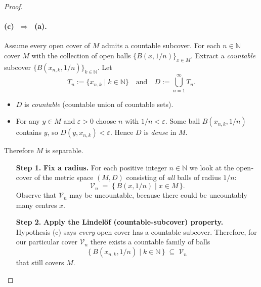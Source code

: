 \documentclass[12pt]{article}
\theoremstyle{definition} %
\theoremstyle{plain} %
\begin{document}
\begin{proof}
  \paragraph{\textbf{(c) $\;\Longrightarrow\;$ (a).}}
  Assume every open cover of $M$ admits a countable subcover.
  For each $n\in\mathbb N$ cover $M$ with the collection of open balls
  $\{B(x,1/n)\}_{x\in M}$.
  Extract a \emph{countable} subcover
  $\{B(x_{n,k},1/n)\}_{k\in\mathbb N}$.
  Let
  \[
      T_n:=\{x_{n,k}\mid k\in\mathbb N\}
      \quad\text{and}\quad
      D:=\bigcup_{n=1}^{\infty}T_n.
  \]
  \begin{itemize}
      \item $D$ is \emph{countable} (countable union of countable sets).
      \item For any $y\in M$ and $\varepsilon>0$ choose $n$ with $1/n<\varepsilon$.
            Some ball $B(x_{n,k},1/n)$ contains $y$, so
            $D(y,x_{n,k})<\varepsilon$.  
            Hence $D$ is \emph{dense} in $M$.
  \end{itemize}
  Therefore $M$ is separable.

\begin{enumerate}
  \item[\textbf{Step 1.}] 
      \textbf{Fix a radius.}  
      For each positive integer \(n\in\mathbb N\) we look at the open‐cover
      of the metric space \((M,D)\) consisting of \emph{all} balls of
      radius \(1/n\):
      \[
          \mathcal V_n \;=\;\bigl\{\,B(x,1/n)\mid x\in M\,\bigr\}.
      \]
      Observe that \(\mathcal V_n\) may be uncountable, because there could
      be uncountably many centres \(x\).

  \item[\textbf{Step 2.}] 
      \textbf{Apply the Lindelöf (countable‐subcover) property.}  
      Hypothesis (c) says \emph{every} open cover has a countable subcover.
      Therefore, for our particular cover \(\mathcal V_n\) there exists a
      countable family of balls
      \[
          \bigl\{\,B(x_{n,k},1/n)\mid k\in\mathbb N\,\bigr\}\;\subseteq\;\mathcal V_n
      \]
      that still covers \(M\).


\end{enumerate}
\end{proof}
\end{document}
